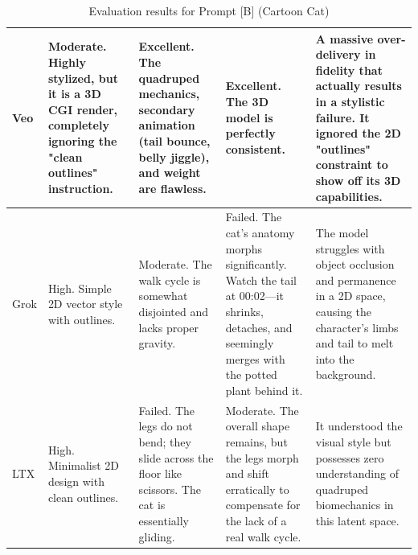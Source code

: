 \documentclass[sigconf]{acmart}
\begin{document}
\begin{table}[t]
\begin{tabularx}{\textwidth}{| l | >{\raggedright\arraybackslash}X | >{\raggedright\arraybackslash}X | >{\raggedright\arraybackslash}X | >{\raggedright\arraybackslash}X |}
        Veo            & Moderate. Highly stylized, but it is a 3D CGI render, completely ignoring the "clean outlines" instruction. & Excellent. The quadruped mechanics, secondary animation (tail bounce, belly jiggle), and weight are flawless.                  & Excellent. The 3D model is perfectly consistent.                                                                                                    & A massive over-delivery in fidelity that actually results in a stylistic failure. It ignored the 2D "outlines" constraint to show off its 3D capabilities.                       \\\hline
        Grok           & High. Simple 2D vector style with outlines.                                                                 & Moderate. The walk cycle is somewhat disjointed and lacks proper gravity.                                                      & Failed. The cat's anatomy morphs significantly. Watch the tail at 00:02—it shrinks, detaches, and seemingly merges with the potted plant behind it. & The model struggles with object occlusion and permanence in a 2D space, causing the character's limbs and tail to melt into the background.                                      \\\hline
        LTX            & High. Minimalist 2D design with clean outlines.                                                             & Failed. The legs do not bend; they slide across the floor like scissors. The cat is essentially gliding.                       & Moderate. The overall shape remains, but the legs morph and shift erratically to compensate for the lack of a real walk cycle.                      & It understood the visual style but possesses zero understanding of quadruped biomechanics in this latent space.                                                                  \\\hline
    \end{tabularx}
    \caption{Evaluation results for Prompt [B] (Cartoon Cat)}
    \label{tab:eval_prompt_5}
\end{table}
\end{document}
